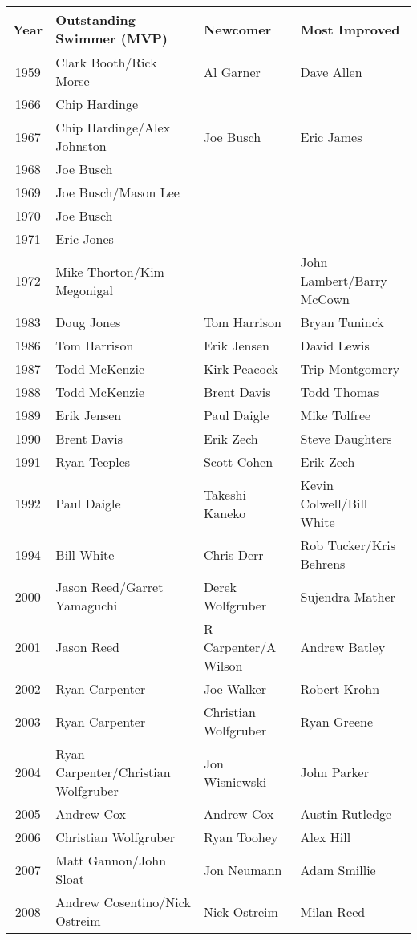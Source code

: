 \begin{table}[htbp]
\centering
\scriptsize
\begin{tabular}{clll}
\toprule
Year & Outstanding Swimmer (MVP) & Newcomer & Most Improved \\
\midrule
1959 & Clark Booth/Rick Morse & Al Garner & Dave Allen \\
1966 & Chip Hardinge &  &  \\
1967 & Chip Hardinge/Alex Johnston & Joe Busch & Eric James \\
1968 & Joe Busch &  &  \\
1969 & Joe Busch/Mason Lee &  &  \\
1970 & Joe Busch &  &  \\
1971 & Eric Jones &  &  \\
1972 & Mike Thorton/Kim Megonigal &  & John Lambert/Barry McCown \\
1983 & Doug Jones & Tom Harrison & Bryan Tuninck \\
1986 & Tom Harrison & Erik Jensen & David Lewis \\
1987 & Todd McKenzie & Kirk Peacock & Trip Montgomery \\
1988 & Todd McKenzie & Brent Davis & Todd Thomas \\
1989 & Erik Jensen & Paul Daigle & Mike Tolfree \\
1990 & Brent Davis & Erik Zech & Steve Daughters \\
1991 & Ryan Teeples & Scott Cohen & Erik Zech \\
1992 & Paul Daigle & Takeshi Kaneko & Kevin Colwell/Bill White \\
1994 & Bill White & Chris Derr & Rob Tucker/Kris Behrens \\
2000 & Jason Reed/Garret Yamaguchi & Derek Wolfgruber & Sujendra Mather \\
2001 & Jason Reed & R Carpenter/A Wilson & Andrew Batley \\
2002 & Ryan Carpenter & Joe Walker & Robert Krohn \\
2003 & Ryan Carpenter & Christian Wolfgruber & Ryan Greene \\
2004 & Ryan Carpenter/Christian Wolfgruber & Jon Wisniewski & John Parker \\
2005 & Andrew Cox & Andrew Cox & Austin Rutledge \\
2006 & Christian Wolfgruber & Ryan Toohey & Alex Hill \\
2007 & Matt Gannon/John Sloat & Jon Neumann & Adam Smillie \\
2008 & Andrew Cosentino/Nick Ostreim & Nick Ostreim & Milan Reed \\

\end{tabular}
\end{table}
